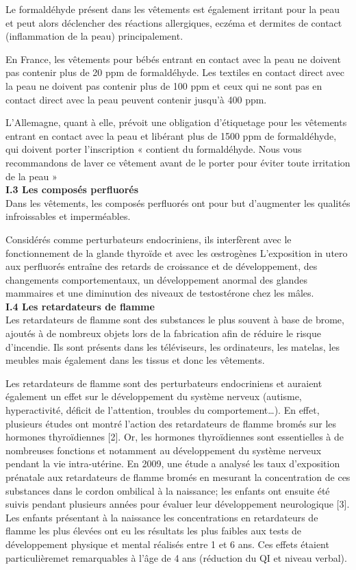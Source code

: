 \documentclass[8pt]{article}
\begin{document}
Le formaldéhyde présent dans les vêtements est également irritant pour la peau et peut alors déclencher des réactions allergiques, eczéma et dermites de contact (inflammation de la peau) principalement.

En France, les vêtements pour bébés entrant en contact avec la peau ne doivent pas contenir plus de 20 ppm de formaldéhyde. Les textiles en contact direct avec la peau ne doivent pas contenir plus de 100 ppm et ceux qui ne sont pas en contact direct avec la peau peuvent contenir jusqu’à 400 ppm.

L’Allemagne, quant à elle, prévoit une obligation d’étiquetage pour les vêtements entrant en contact avec la peau et libérant plus de 1500 ppm de formaldéhyde, qui doivent porter l’inscription « contient du formaldéhyde. Nous vous recommandons de laver ce vêtement avant de le porter pour éviter toute irritation de la peau »\\

\textbf{I.3 Les composés perfluorés}\\

Dans les vêtements, les composés perfluorés ont pour but d’augmenter les qualités infroissables et imperméables.

Considérés comme perturbateurs endocriniens, ils interfèrent avec le fonctionnement de la glande thyroïde et avec les œstrogènes L’exposition in utero aux perfluorés entraîne des retards de croissance et de développement, des changements comportementaux, un développement anormal des glandes mammaires et une diminution des niveaux de testostérone chez les mâles.\\

\textbf{I.4 Les retardateurs de flamme}\\


Les retardateurs de flamme sont des substances le plus souvent à base de brome, ajoutés à de nombreux objets lors de la fabrication afin de réduire le risque d’incendie. Ils sont présents dans les téléviseurs, les ordinateurs, les matelas, les meubles mais également dans les tissus et donc les vêtements.

Les retardateurs de flamme sont des perturbateurs endocriniens et auraient également un effet sur le développement du système nerveux (autisme, hyperactivité, déficit de l’attention, troubles du comportement…). En effet, plusieurs études ont montré l’action des retardateurs de flamme bromés sur les hormones thyroïdiennes [2]. Or, les hormones thyroïdiennes sont essentielles à de nombreuses fonctions et notamment au développement du système nerveux pendant la vie intra-utérine. En 2009, une étude a analysé les taux d’exposition prénatale aux retardateurs de flamme bromés en mesurant la concentration de ces substances dans le cordon ombilical à la naissance; les enfants ont ensuite été suivis pendant plusieurs années pour évaluer leur développement neurologique [3]. Les enfants présentant à la naissance les concentrations en retardateurs de flamme les plus élevées ont eu les résultats les plus faibles aux tests de développement physique et mental réalisés entre 1 et 6 ans. Ces effets étaient particulièremet remarquables à l’âge de 4 ans (réduction du QI et niveau verbal).\\
\end{document}
